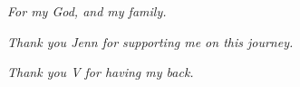 \begin{center}
    \textit{For my God, and my family.} 

    \textit{Thank you Jenn for supporting me on this journey.}

    \textit{Thank you V for having my back.}
  \end{center}